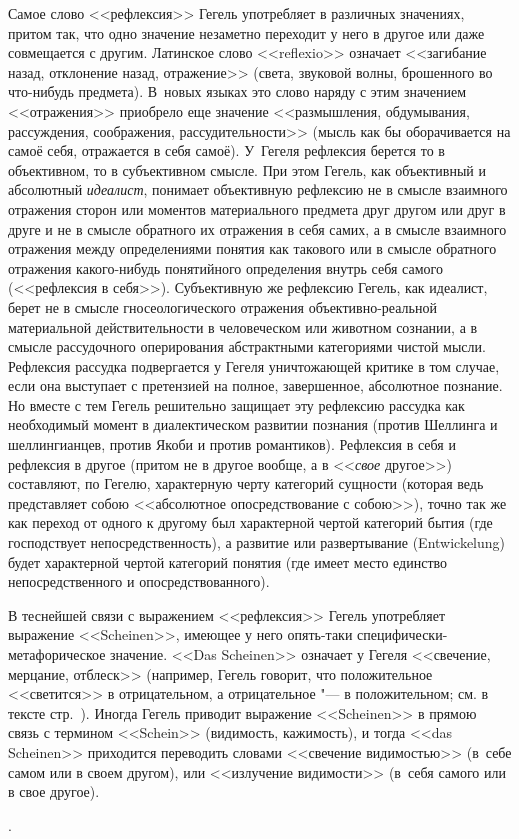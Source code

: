 {Самое слово <<рефлексия>> Гегель употребляет в различных значениях, притом
так, что одно значение незаметно переходит у него в другое или даже
совмещается с другим. Латинское слово <<reflexio>> означает <<загибание назад,
отклонение назад, отражение>> (света, звуковой волны, брошенного во
что-нибудь предмета). В~новых языках это слово наряду с этим значением
<<отражения>> приобрело еще значение <<размышления, обдумывания, рассуждения,
соображения, рассудительности>> (мысль как бы оборачивается на самоё себя,
отражается в себя самоё). У~Гегеля рефлексия берется то в объективном, то в
субъективном смысле. При этом Гегель, как объективный и абсолютный
{\em идеалист}, понимает объективную рефлексию не в смысле взаимного
отражения сторон или моментов материального предмета друг другом или друг в
друге и не в смысле обратного их отражения в себя самих, а в смысле
взаимного отражения между определениями понятия как такового или в смысле
обратного отражения какого-нибудь понятийного определения внутрь себя
самого (<<рефлексия в себя>>). Субъективную же рефлексию Гегель, как
идеалист, берет не в смысле гносеологического отражения объективно-реальной
материальной действительности в человеческом или животном сознании, а в
смысле рассудочного оперирования абстрактными категориями чистой мысли.
Рефлексия рассудка подвергается у Гегеля уничтожающей критике в том случае,
если она выступает с претензией на полное, завершенное, абсолютное
познание. Но вместе с тем Гегель решительно защищает эту рефлексию рассудка
как необходимый момент в диалектическом развитии познания (против Шеллинга
и шеллингианцев, против Якоби и против романтиков). Рефлексия в себя и
рефлексия в другое (притом не в другое вообще, а в <<{\em свое} другое>>)
составляют, по Гегелю, характерную черту категорий сущности (которая ведь
представляет собою <<абсолютное опосредствование с собою>>), точно так же как
переход от одного к другому был характерной чертой категорий бытия (где
господствует непосредственность), а развитие или развертывание
(Ent\-wicke\-lung) будет характерной чертой категорий понятия (где имеет место
единство непосредственного и опосредствованного).

В теснейшей связи с выражением <<рефлексия>> Гегель употребляет выражение
<<Scheinen>>, имеющее у него опять-таки специфически-метафорическое значение.
<<Das Scheinen>> означает у Гегеля <<свечение, мерцание, отблеск>> (например,
Гегель говорит, что положительное <<светится>> в отрицательном, а
отрицательное "--- в положительном; см. в тексте стр.~\pageref{scheinen}).
Иногда Гегель приводит выражение <<Scheinen>> в прямою связь с термином
<<Schein>> (видимость, кажимость), и тогда <<das Scheinen>> приходится
переводить словами <<свечение видимостью>> (в~себе самом или в своем другом),
или <<излучение видимости>> (в~себя самого или в свое другое).}.
